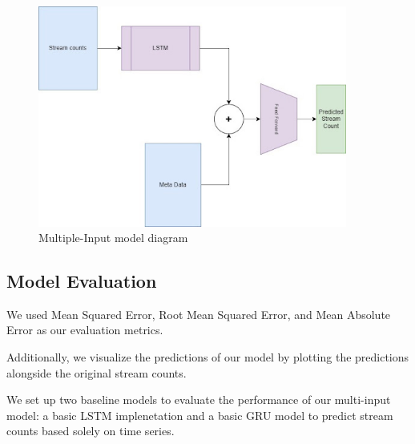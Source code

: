 \documentclass[11pt]{article}
\begin{document}
\begin{figure}
    \centering{}
    \includegraphics[width=4in]{figs/model_arch_sketch.jpg}
    \caption{Multiple-Input model diagram}
\end{figure}

\subsection{Model Evaluation}
We used Mean Squared Error, Root Mean Squared Error, and Mean Absolute Error as our evaluation metrics. 

Additionally, we visualize the predictions of our model by plotting the predictions alongside the original stream counts.

We set up two baseline models to evaluate the performance of our multi-input model: a basic LSTM implenetation and a basic GRU model to predict stream counts based solely on time series.


% 
% 
% 
% 
\end{document}
